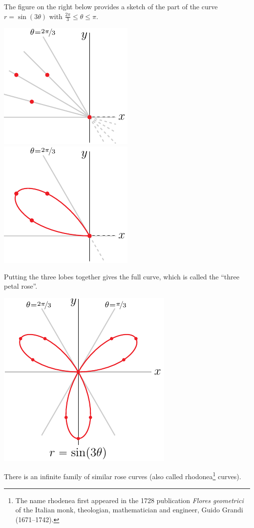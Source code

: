 \begin{eg}
\begin{itemize}
The figure on the right below provides a sketch of the
part of the curve $r=\sin(3\theta)$ with 
$\frac{2\pi}{3}\le \theta\le \pi$. 
\begin{efig}
\begin{center}
    \includegraphics{rose3.pdf}\qquad\qquad
    \includegraphics{rose3b.pdf}
\end{center}
\end{efig}
\end{itemize}
Putting the three lobes together gives the full curve, which is called
the ``three petal rose''.
\begin{efig}
\begin{center}
    \includegraphics{rose3F.pdf}
\end{center}
\end{efig}
There is an infinite family of similar rose curves (also called
rhodonea\footnote{The name rhodenea first appeared in the 1728 publication
\emph{Flores geometrici} of the Italian monk, theologian, mathematician
and engineer, Guido Grandi (1671--1742).} curves).


\end{eg}

